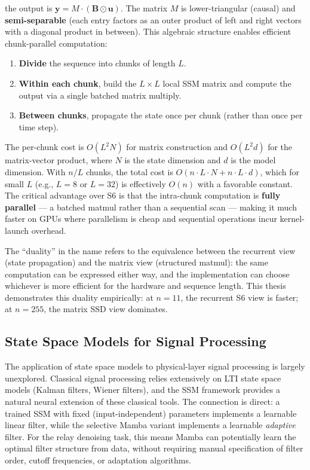 \documentclass[
  english,
  12pt,
  12pt,
  a4paper,
  oneside]{report}
\providecommand{\tightlist}{%
  \setlength{\itemsep}{0pt}\setlength{\parskip}{0pt}}
\begin{document}
the output is \(\mathbf{y} = M \cdot (\mathbf{B} \odot \mathbf{u})\). The matrix \(M\) is lower-triangular (causal) and \textbf{semi-separable} (each entry factors as an outer product of left and right vectors with a diagonal product in between). This algebraic structure enables efficient chunk-parallel computation:

\begin{enumerate}
\def\labelenumi{\arabic{enumi}.}
\tightlist
\item
  \textbf{Divide} the sequence into chunks of length \(L\).
\item
  \textbf{Within each chunk}, build the \(L \times L\) local SSM matrix and compute the output via a single batched matrix multiply.
\item
  \textbf{Between chunks}, propagate the state once per chunk (rather than once per time step).
\end{enumerate}

The per-chunk cost is \(O(L^2 N)\) for matrix construction and \(O(L^2 d)\) for the matrix-vector product, where \(N\) is the state dimension and \(d\) is the model dimension. With \(n/L\) chunks, the total cost is \(O(n \cdot L \cdot N + n \cdot L \cdot d)\), which for small \(L\) (e.g., \(L = 8\) or \(L = 32\)) is effectively \(O(n)\) with a favorable constant. The critical advantage over S6 is that the intra-chunk computation is \textbf{fully parallel} --- a batched matmul rather than a sequential scan --- making it much faster on GPUs where parallelism is cheap and sequential operations incur kernel-launch overhead.

The ``duality'' in the name refers to the equivalence between the recurrent view (state propagation) and the matrix view (structured matmul): the same computation can be expressed either way, and the implementation can choose whichever is more efficient for the hardware and sequence length. This thesis demonstrates this duality empirically: at \(n = 11\), the recurrent S6 view is faster; at \(n = 255\), the matrix SSD view dominates.

\subsection{State Space Models for Signal Processing}\label{sec:state-space-models-for-signal-processing}

The application of state space models to physical-layer signal processing is largely unexplored. Classical signal processing relies extensively on LTI state space models (Kalman filters, Wiener filters), and the SSM framework provides a natural neural extension of these classical tools. The connection is direct: a trained SSM with fixed (input-independent) parameters implements a learnable linear filter, while the selective Mamba variant implements a learnable \emph{adaptive} filter. For the relay denoising task, this means Mamba can potentially learn the optimal filter structure from data, without requiring manual specification of filter order, cutoff frequencies, or adaptation algorithms.
\end{document}
